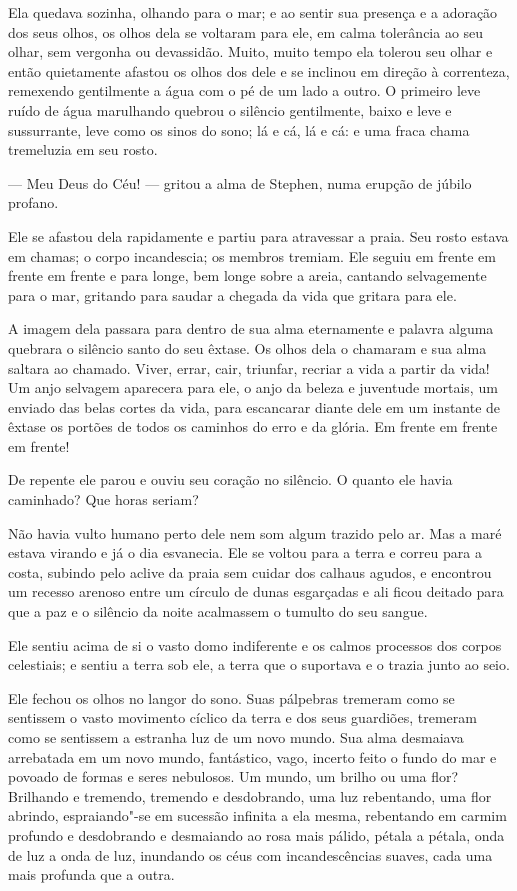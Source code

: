 Ela quedava sozinha, olhando para o mar; e ao sentir sua presença e a
adoração dos seus olhos, os olhos dela se voltaram para ele, em calma
tolerância ao seu olhar, sem vergonha ou devassidão. Muito, muito tempo
ela tolerou seu olhar e então quietamente afastou os olhos dos dele e
se inclinou em direção à correnteza, remexendo gentilmente a água com o
pé de um lado a outro. O primeiro leve ruído de água marulhando quebrou
o silêncio gentilmente, baixo e leve e sussurrante, leve como os sinos
do sono; lá e cá, lá e cá: e uma fraca chama tremeluzia em seu rosto.

 --- Meu Deus do Céu! --- gritou a alma de Stephen, numa erupção de júbilo
profano.

Ele se afastou dela rapidamente e partiu para atravessar a praia. Seu
rosto estava em chamas; o corpo incandescia; os membros tremiam. Ele
seguiu em frente em frente em frente e para longe, bem longe sobre a
areia, cantando selvagemente para o mar, gritando para saudar a chegada
da vida que gritara para ele.

A imagem dela passara para dentro de sua alma eternamente e palavra
alguma quebrara o silêncio santo do seu êxtase. Os olhos dela o
chamaram e sua alma saltara ao chamado. Viver, errar, cair, triunfar,
recriar a vida a partir da vida! Um anjo selvagem aparecera para ele, o
anjo da beleza e juventude mortais, um enviado das belas cortes da
vida, para escancarar diante dele em um instante de êxtase os portões
de todos os caminhos do erro e da glória. Em frente em frente em
frente!

De repente ele parou e ouviu seu coração no silêncio. O quanto ele havia
caminhado? Que horas seriam?

Não havia vulto humano perto dele nem som algum trazido pelo ar. Mas a
maré estava virando e já o dia esvanecia. Ele se voltou para a terra e
correu para a costa, subindo pelo aclive da praia sem cuidar dos
calhaus agudos, e encontrou um recesso arenoso entre um círculo de
dunas esgarçadas e ali ficou deitado para que a paz e o silêncio da
noite acalmassem o tumulto do seu sangue.

Ele sentiu acima de si o vasto domo indiferente e os calmos processos
dos corpos celestiais; e sentiu a terra sob ele, a terra que o
suportava e o trazia junto ao seio.

Ele fechou os olhos no langor do sono. Suas pálpebras tremeram como se
sentissem o vasto movimento cíclico da terra e dos seus guardiões,
tremeram como se sentissem a estranha luz de um novo mundo. Sua alma
desmaiava arrebatada em um novo mundo, fantástico, vago, incerto feito
o fundo do mar e povoado de formas e seres nebulosos. Um mundo, um
brilho ou uma flor? Brilhando e tremendo, tremendo e desdobrando, uma
luz rebentando, uma flor abrindo, espraiando"-se em sucessão infinita a
ela mesma, rebentando em carmim profundo e desdobrando e desmaiando ao
rosa mais pálido, pétala a pétala, onda de luz a onda de luz, inundando
os céus com incandescências suaves, cada uma mais profunda que a outra.

